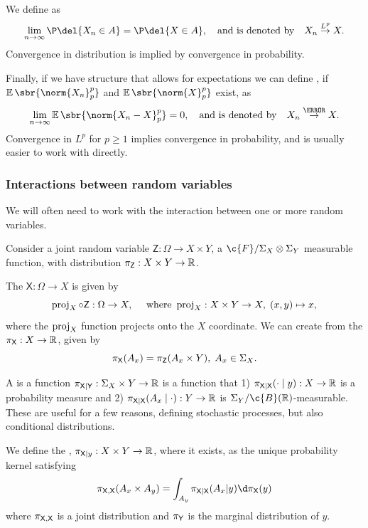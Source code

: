 We define  as
\[
	\lim_{n\to \infty} \P\del{X_n\in A} = \P\del{X\in A}, \quad \text{and is denoted by} \quad X_n \overset{L^p}{\to} X
.\]
Convergence in distribution is implied by convergence in probability.

Finally, if we have structure that allows for expectations we can define , if \(\E\sbr{\norm{X_n}_p^p}\) and \(\E\sbr{\norm{X}_p^p}\) exist, as
\[
	\lim_{n\to\infty} \E\sbr{\norm{X_n - X}_p^p} = 0, \quad \text{and is denoted by} \quad X_n \overset{\as}{\to} X
.\]
Convergence in \(L^p\) for \(p\geq1\) implies convergence in probability, and is usually easier to work with directly.

\subsubsection{Interactions between random variables}
We will often need to work with the interaction between one or more random variables.

Consider a joint random variable \(\mathsf{Z}: \Omega \to X \times Y\), a \(\c{F}/\sigalg{X}\otimes \sigalg{Y}\) measurable function, with distribution \(\pi_{\mathsf{Z}}:X \times Y \to \mathbb{R}\).

The  \(\mathsf{X}: \Omega \to X\) is given by \[\operatorname{proj}_X\circ \mathsf{Z}: \Omega \to X, \quad \text{ where } \operatorname{proj}_X: X\times Y \to X, \; (x, y) \mapsto x,\] where the \(\operatorname{proj}_X\) function projects onto the \(X\) coordinate. 
We can create from the  \(\pi_{\mathsf{X}}:X\to\mathbb{R}\), given by \[\pi_{\mathsf{X}}(A_x) = \pi_{\mathsf{Z}}(A_x\times Y), \; A_x\in\Sigma_{X}.\]

A  is a function \(\pi_{\mathsf{X} | \mathsf{Y}}: \Sigma_{X}\times Y \to \mathbb{R}\) is a function that 1) \(\pi_{\mathsf{X}|\mathsf{X}}(\cdot \mid y): X\to \mathbb{R}\) is a probability measure and 2) \(\pi_{\mathsf{X}|\mathsf{X}} (A_x \mid \cdot):Y\to\mathbb{R}\) is \(\sigalg{Y}/\c{B}(\R)\)-measurable. These are useful for a few reasons, defining stochastic processes, but also conditional distributions. 

We define the , \(\pi_{\mathsf{X}|y}:X\times Y\to \mathbb{R}\), where it exists, as the unique probability kernel satisfying
\[\pi_{\up{X}, \up{X}}(A_x \times A_y) = \int_{A_y} \pi_{\up{X}|\up{X}}(A_x | y) \d\pi_\up{X}(y)\]
where \(\pi_{\mathsf{X},\mathsf{X}}\) is a joint distribution and \(\pi_{\mathsf{Y}}\) is the marginal distribution of \(y\).

